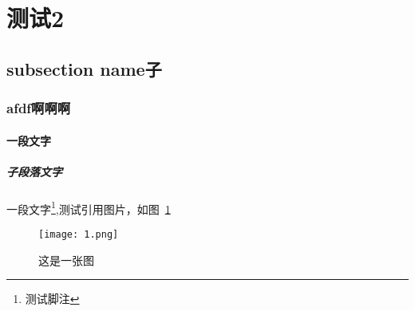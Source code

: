 
\section{测试2}
\subsection{subsection name子}
\subsubsection{afdf啊啊啊}
\paragraph{一段文字}
\subparagraph{子段落文字}

一段文字\footnote{测试脚注},测试引用图片，如图~\ref{fig:1}
%

%
%
\begin{figure}[t]
  \texttt{[image: 1.png]}
  \caption{这是一张图}
  \label{fig:1}
\end{figure}
